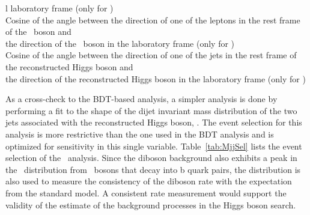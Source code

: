 \documentclass[12pt,twoside,a4paper,cmspaper,final,collab]{cms-tdr}
\begin{document}
\begin{table}[tbp]
{\begin{scotch}{l}
laboratory frame  (only for \ZllH )\\
Cosine of the angle between the direction of one of the leptons in the
rest frame of the \cPZ\  boson and\\ \hspace{0.2in}  the direction of the \cPZ\  boson in the
laboratory frame  (only for \ZllH )\\
Cosine of the angle between the direction of one
of the jets in the rest frame of the reconstructed Higgs boson and\\\hspace{0.2in}  the
direction of the reconstructed Higgs boson in the laboratory frame  (only for \ZllH )\\
\end{scotch}}
\end{table}




As a cross-check to the BDT-based analysis, a simpler analysis is
done by performing a fit to the shape of the dijet invariant mass distribution
of the two jets associated with the reconstructed Higgs boson, \Mjj. The event
selection for this analysis is more
restrictive than the one used in the BDT analysis and is optimized for
sensitivity in this single variable. Table~\ref{tab:MjjSel} %
lists the event
selection of the \Mjj\ analysis. Since the diboson background also
exhibits a peak in the \Mjj\ distribution from \cPZ\  bosons that decay into
b quark pairs, the distribution is also used to measure the
consistency of the diboson rate with the expectation from the
standard model. A consistent rate measurement would support the
validity of the estimate of the background processes in the Higgs
boson search.
\end{document}

